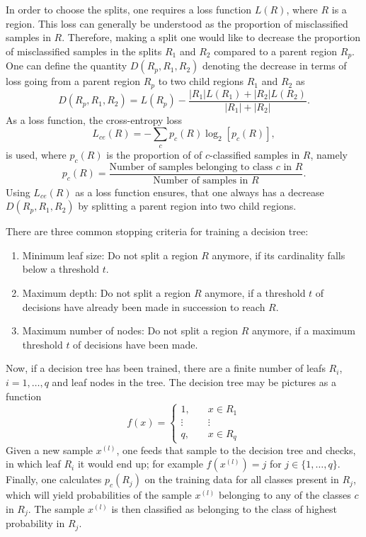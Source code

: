 \documentclass[a4paper,11pt]{article}
\numberwithin{equation}{section}
\begin{document}
{In order to choose the splits, one requires a loss function $L(R)$, where $R$ is a region. This loss can generally be understood as the proportion of misclassified samples in $R$. Therefore, making a split one would like to decrease the proportion of misclassified samples in the splits $R_1$ and $R_2$ compared to a parent region $R_p$. One can define the quantity $D(R_p,R_1,R_2)$ denoting the decrease in terms of loss going from a parent region $R_p$ to two child regions $R_1$ and $R_2$ as \begin{equation}
	D(R_p, R_1, R_2) = L(R_p) - \frac{|R_1|L(R_1)+|R_2|L(R_2)}{|R_1|+|R_2|}.
\end{equation}
As a loss function, the cross-entropy loss \begin{equation}
	L_{ce}(R) = -\sum_c p_c(R)\log_2\left[p_c(R)\right],
\end{equation} is used, where $p_c(R)$ is the proportion of of $c$-classified samples in $R$, namely \begin{equation}
p_c(R) = \frac{\text{Number of samples belonging to class $c$ in $R$}}{\text{Number of samples in $R$}}.
\end{equation} Using $L_{ce}(R)$ as a loss function ensures, that one always has a decrease $D(R_p, R_1, R_2)$ by splitting a parent region into two child regions.

There are three common stopping criteria for training a decision tree:
\begin{enumerate}
	\item Minimum leaf size: Do not split a region $R$ anymore, if its cardinality falls below a threshold $t$.
	\item Maximum depth: Do not split a region $R$ anymore, if a threshold $t$ of decisions have already been made in succession to reach $R$.
	\item Maximum number of nodes: Do not split a region $R$ anymore, if a maximum threshold $t$ of decisions have been made.
\end{enumerate}

Now, if a decision tree has been trained, there are a finite number of leafs $R_i$, $i=1,\dots,q$ and leaf nodes in the tree. The decision tree may be pictures as a function \begin{equation}
	f(x) = \begin{cases}
		1, &\quad x \in R_1 \\
		\vdots &\quad \vdots \\
		q, &\quad x \in R_q
	\end{cases}
\end{equation} Given a new sample $x^{(l)}$, one feeds that sample to the decision tree and checks, in which leaf $R_i$ it would end up; for example $f(x^{(l)}) = j$ for $j \in \{1,\dots,q\}$. Finally, one calculates $p_c(R_j)$ on the training data for all classes present in $R_j$, which will yield probabilities of the sample $x^{(l)}$ belonging to any of the classes $c$ in $R_j$. The sample $x^{(l)}$ is then classified as belonging to the class of highest probability in $R_j$.
}
\end{document}
